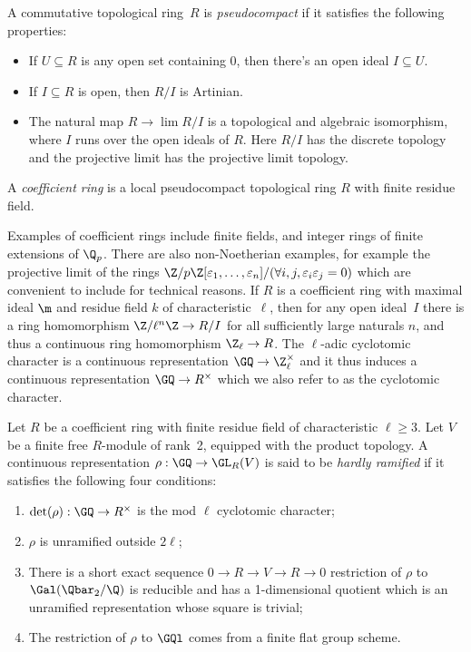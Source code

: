 \begin{definition} A commutative topological ring~$R$ is \emph{pseudocompact} if it satisfies
  the following properties:
  \begin{itemize}
    \item If $U\subseteq R$ is any open set containing 0, then there's an open ideal $I\subseteq U$.
    \item If $I\subseteq R$ is open, then $R/I$ is Artinian.
    \item The natural map $R\to\lim R/I$ is a topological and algebraic isomorphism, where $I$ runs
      over the open ideals of $R$. Here $R/I$ has the discrete topology and the projective
      limit has the projective limit topology.
  \end{itemize}
\end{definition}

\begin{definition} A \emph{coefficient ring} is a local pseudocompact topological ring $R$ with
  finite residue field.
\end{definition}

Examples of coefficient rings include finite fields, and integer rings of finite extensions
of $\Q_p$. There are also non-Noetherian examples, for example the projective limit of
the rings $\Z/p\Z[\varepsilon_1,\ldots,\varepsilon_n]/(\forall i,j,\varepsilon_i\varepsilon_j=0)$
which are convenient to include
for technical reasons. If $R$ is a coefficient ring with maximal ideal $\m$
and residue field $k$ of characteristic~$\ell$, then for any open ideal~$I$ there is
a ring homomorphism $\Z/\ell^n\Z\to R/I$ for all sufficiently large naturals $n$,
and thus a continuous ring homomorphism $\Z_{\ell}\to R$. The $\ell$-adic cyclotomic character
is a continuous
representation $\GQ\to\Z_{\ell}^\times$ and it thus induces a continuous
representation $\GQ\to R^\times$ which we also refer to as the cyclotomic character.

\begin{definition}
  \label{hardly_ramified}
  Let $R$ be a coefficient ring with finite residue field of characteristic $\ell\geq3$.
  Let $V$ be a finite free $R$-module of rank~2, equipped with the product topology. A
  continuous representation $\rho: \GQ\to \GL_R(V)$ is said to be \emph{hardly ramified} if it
  satisfies the following four conditions:
  \begin{enumerate}
  \item $\det(\rho):\GQ\to R^\times$ is the mod $\ell$ cyclotomic character;
  \item $\rho$ is unramified outside $2\ell$;
  \item There is a short exact sequence $0\to R\to V\to R\to 0$ restriction of $\rho$ to $\Gal(\Qbar_2/\Q)$ is reducible and has a
    1-dimensional quotient which is an unramified representation whose square is trivial;
  \item The restriction of $\rho$ to $\GQl$ comes from a finite flat group scheme.
  \end{enumerate}
\end{definition}

